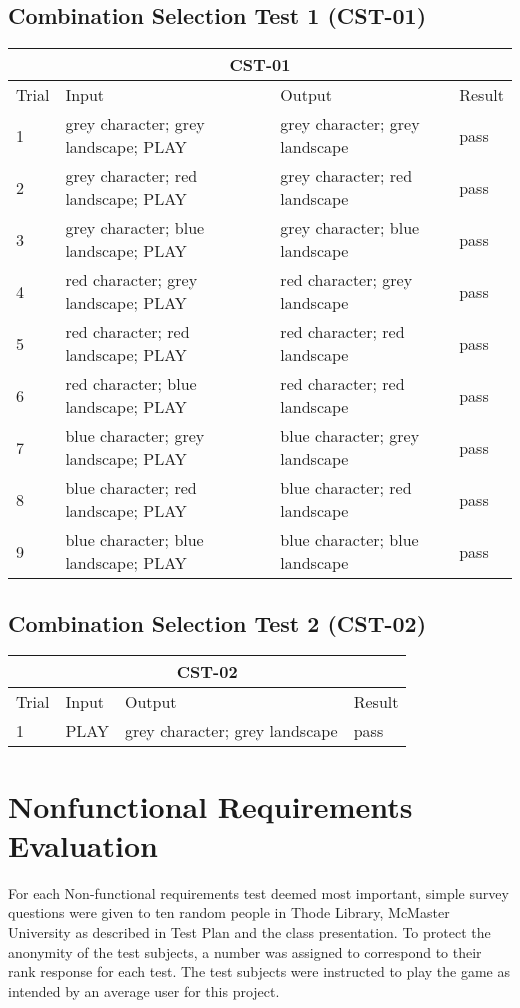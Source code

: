\documentclass[12pt, titlepage]{article}
\begin{document}
\subsection{Combination Selection Test 1 (CST-01)}
\begin{tabular}{ |p{3cm}||p{3cm}|p{3cm}|p{3cm}|  }
 \hline
 \multicolumn{4}{|c|}{CST-01} \\
 \hline
Trial & Input & Output & Result\\
 \hline
1 & grey character; grey landscape; PLAY & grey character; grey landscape &  pass\\
\midrule
2 & grey character; red landscape; PLAY & grey character; red landscape &  pass\\
\midrule
3 & grey character; blue landscape; PLAY & grey character; blue landscape &  pass\\
\midrule
4 & red character; grey landscape; PLAY & red character; grey landscape &  pass\\
\midrule
5 & red character; red landscape; PLAY & red character; red landscape &  pass\\
\midrule
6 & red character; blue landscape; PLAY & red character; red landscape &  pass\\
\midrule
7 & blue character; grey landscape; PLAY & blue character; grey landscape &  pass\\
\midrule
8 & blue character; red landscape; PLAY & blue character; red landscape &  pass\\
\midrule
9 & blue character; blue landscape; PLAY & blue character; blue landscape &  pass\\
 \hline
\end{tabular}

\subsection{Combination Selection Test 2 (CST-02)}
\begin{tabular}{ |p{3cm}||p{3cm}|p{3cm}|p{3cm}|  }
 \hline
 \multicolumn{4}{|c|}{CST-02} \\
 \hline
Trial & Input & Output & Result\\
 \hline
1 & PLAY & grey character; grey landscape &  pass\\
 \hline
\end{tabular}

\section{Nonfunctional Requirements Evaluation}
For each Non-functional requirements test deemed most important, simple survey questions were given to ten random people in Thode Library, McMaster University as described in Test Plan and the class presentation. To protect the anonymity of the test subjects, a number was assigned to correspond to their rank response for each test. The test subjects were instructed to play the game as intended by an average user for this project.
\end{document}
